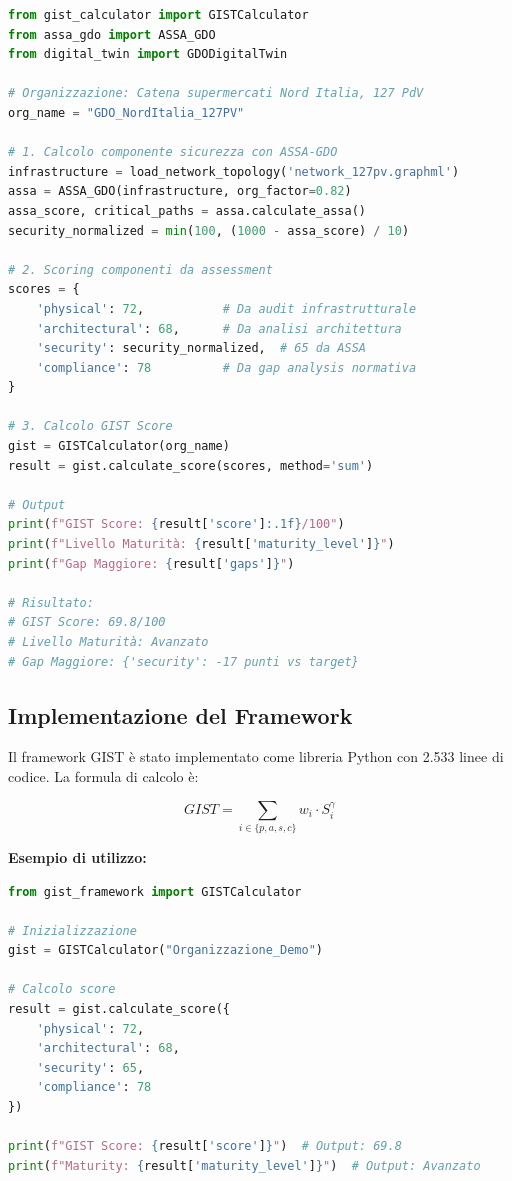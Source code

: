 \begin{lstlisting}[language=Python, caption=Calcolo GIST per catena GDO reale]
from gist_calculator import GISTCalculator
from assa_gdo import ASSA_GDO
from digital_twin import GDODigitalTwin

# Organizzazione: Catena supermercati Nord Italia, 127 PdV
org_name = "GDO_NordItalia_127PV"

# 1. Calcolo componente sicurezza con ASSA-GDO
infrastructure = load_network_topology('network_127pv.graphml')
assa = ASSA_GDO(infrastructure, org_factor=0.82)
assa_score, critical_paths = assa.calculate_assa()
security_normalized = min(100, (1000 - assa_score) / 10)

# 2. Scoring componenti da assessment
scores = {
    'physical': 72,           # Da audit infrastrutturale
    'architectural': 68,      # Da analisi architettura
    'security': security_normalized,  # 65 da ASSA
    'compliance': 78          # Da gap analysis normativa
}

# 3. Calcolo GIST Score
gist = GISTCalculator(org_name)
result = gist.calculate_score(scores, method='sum')

# Output
print(f"GIST Score: {result['score']:.1f}/100")
print(f"Livello Maturità: {result['maturity_level']}")
print(f"Gap Maggiore: {result['gaps']}")

# Risultato:
# GIST Score: 69.8/100
# Livello Maturità: Avanzato
# Gap Maggiore: {'security': -17 punti vs target}
\end{lstlisting}

\subsection{\texorpdfstring{Implementazione del Framework}{5.3.2 - Implementazione del Framework}}

Il framework GIST è stato implementato come libreria Python con 2.533 
linee di codice. La formula di calcolo è:

\begin{equation}
GIST = \sum_{i \in \{p,a,s,c\}} w_i \cdot S_i^{\gamma}
\end{equation}

\textbf{Esempio di utilizzo:}
\begin{lstlisting}[language=Python]
from gist_framework import GISTCalculator

# Inizializzazione
gist = GISTCalculator("Organizzazione_Demo")

# Calcolo score
result = gist.calculate_score({
    'physical': 72,
    'architectural': 68,
    'security': 65,
    'compliance': 78
})

print(f"GIST Score: {result['score']}")  # Output: 69.8
print(f"Maturity: {result['maturity_level']}")  # Output: Avanzato
\end{lstlisting}

